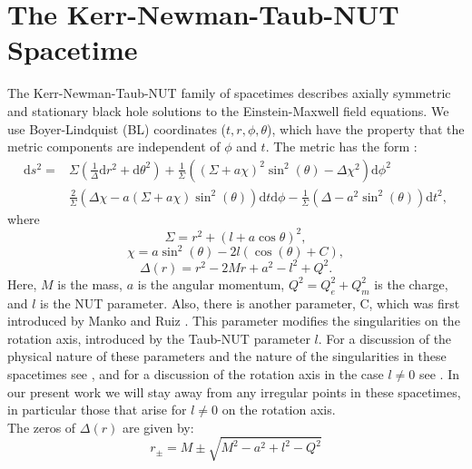 \documentclass[reqno]{amsart}
\numberwithin{equation}{section}
\theoremstyle{plain}
\theoremstyle{definition}
\begin{document}
\section{The Kerr-Newman-Taub-NUT Spacetime} \label{sec:Kerr-Newman-Taub-NUT} 
The Kerr-Newman-Taub-NUT family of spacetimes describes axially symmetric and stationary black hole solutions to the Einstein-Maxwell field equations.  We use Boyer-Lindquist (BL) coordinates ($t, r,\phi,\theta$), which have the property that the metric components are independent of $\phi$ and $t$. The metric has the form \cite{griffiths2009}:
\begin{equation}
\label{eq:metric}
\begin{split}
    \mathrm{d}s^2 =& \Sigma \left(\frac{1}{\Delta}\mathrm{d} r^2 + \mathrm{d}\theta^2 \right)+ \frac{1}{\Sigma}\left((\Sigma+ a \chi)^2 \sin^2(\theta) -\Delta \chi^2\right)\mathrm{d} \phi^2\\
    & \frac{2}{\Sigma}\left(\Delta\chi-a(\Sigma+a\chi)\sin^2(\theta)\right)  \mathrm{d}t\mathrm{d}\phi- \frac{1}{\Sigma}\left(\Delta-a^2\sin^2(\theta)\right)\mathrm{d}t^2,
 \end{split}
\end{equation}
 where
\begin{equation}
\Sigma = r^2 + (l+a \cos  \theta)^2,
\end{equation}
\begin{equation}
\chi=a\sin^2(\theta)-2 l (\cos(\theta)+C),
\end{equation}
\begin{equation}
\Delta (r)= r^2 - 2Mr + a^2-l^2+Q^2.
\end{equation}
Here, $M$ is the mass, $a$ is the angular momentum, $Q^2 = Q^2_e + Q^2_m$ is the charge, and $l$ is the NUT parameter. Also, there is another parameter, C, which was first introduced by Manko and Ruiz \cite{Manko-Ruiz}. This parameter modifies the singularities on the rotation axis, introduced by the Taub-NUT parameter $l$. For a discussion of the physical nature of these parameters and the nature of the singularities in these spacetimes see \cite{grenzebach_photon_2014}, and for a discussion of the rotation axis in the case $l\neq0$ see \cite{TaubNUTsingularities}. In our present work we will stay away from any irregular points in these spacetimes, in particular those that arise for $l\neq0$ on the rotation axis. \\The zeros of $\Delta(r)$ are given by:
\begin{equation}
r_\pm=M\pm\sqrt{M^2-a^2+l^2- Q^2}
\end{equation}
\end{document}
